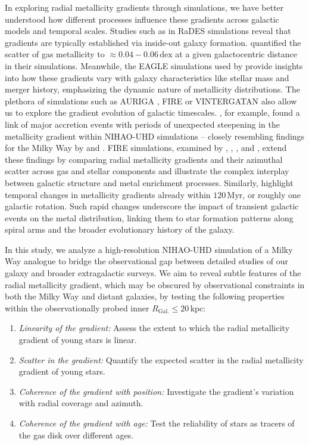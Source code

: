 \documentclass[twocolumn,apj,numberedappendix,appendixfloats,twocolappendix]{openjournal}
\begin{document}
\begin{CJK*}{UTF8}{gbsn}
In exploring radial metallicity gradients through simulations, we have better understood how different processes influence these gradients across galactic models and temporal scales. Studies such as \citet{Pilkington2012} in RaDES simulations reveal that gradients are typically established via inside-out galaxy formation. \citet{Khoperskov2023e} quantified the scatter of gas metallicity to $\approx 0.04-0.06\,\mathrm{dex}$ at a given galactocentric distance in their simulations. Meanwhile, the EAGLE simulations used by \citet{Tissera2019} provide insights into how these gradients vary with galaxy characteristics like stellar mass and merger history, emphasizing the dynamic nature of metallicity distributions. The plethora of simulations such as AURIGA \citep{Grand2016}, FIRE \citep[][see their Fig. 6]{Ma2017} or VINTERGATAN \citep[see their Fig. 9;][]{Agertz2021} also allow us to explore the gradient evolution of galactic timescales. \citet{Buck2023}, for example, found a link of major accretion events with periods of unexpected steepening in the metallicity gradient within NIHAO-UHD simulations -- closely resembling findings for the Milky Way by \citet{Lu2022} and \citet{Ratcliffe2023}. FIRE simulations, examined by \citet{Bellardini2021}, \citet{Bellardini2022}, \citet{Orr2023}, and \citet{Graf2024}, extend these findings by comparing radial metallicity gradients and their azimuthal scatter across gas and stellar components and illustrate the complex interplay between galactic structure and metal enrichment processes. Similarly, \citet{Grand2015,Grand2016} highlight temporal changes in metallicity gradients already within $120\,\mathrm{Myr}$, or roughly one galactic rotation. Such rapid changes underscore the impact of transient galactic events on the metal distribution, linking them to star formation patterns along spiral arms and the broader evolutionary history of the galaxy.

In this study, we analyze a high-resolution NIHAO-UHD simulation of a Milky Way analogue to bridge the observational gap between detailed studies of our galaxy and broader extragalactic surveys. We aim to reveal subtle features of the radial metallicity gradient, which may be obscured by observational constraints in both the Milky Way and distant galaxies, by testing the following properties within the observationally probed inner $R_\mathrm{Gal.} \leq 20\,\mathrm{kpc}$:
\begin{enumerate}
\item \textit{Linearity of the gradient:} Assess the extent to which the radial metallicity gradient of young stars is linear.
\item \textit{Scatter in the gradient:} Quantify the expected scatter in the radial metallicity gradient of young stars.
\item \textit{Coherence of the gradient with position:} Investigate the gradient's variation with radial coverage and azimuth.
\item \textit{Coherence of the gradient with age:} Test the reliability of stars as tracers of the gas disk over different ages.
\end{enumerate}


\end{CJK*}
\end{document}
